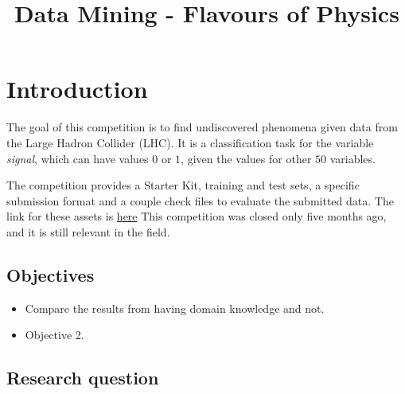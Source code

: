 \documentclass[conference]{IEEEtran}
\begin{document}
 
\title{Data Mining - Flavours of Physics}

\author{

}

\maketitle


\begin{abstract}
\end{abstract}


\IEEEpeerreviewmaketitle


\section{Introduction}

The goal of this competition is to find undiscovered phenomena given data from the Large Hadron Collider (LHC). It is a classification task for the variable \textit{signal}, which can have values $0$ or $1$, given the values for other $50$ variables. 

The competition provides a Starter Kit, training and test sets, a specific submission format and a couple check files to evaluate the submitted data. The link for these assets is \href{https://www.kaggle.com/c/flavours-of-physics/data}{here} This competition was closed only five months ago, and it is still relevant in the field.

\subsection{Objectives}

\begin{itemize}
	\item Compare the results from having domain knowledge and not.
	\item Objective 2. %
\end{itemize}
 
\subsection{Research question}
\label{sec:researchQuestions}
\end{document}

